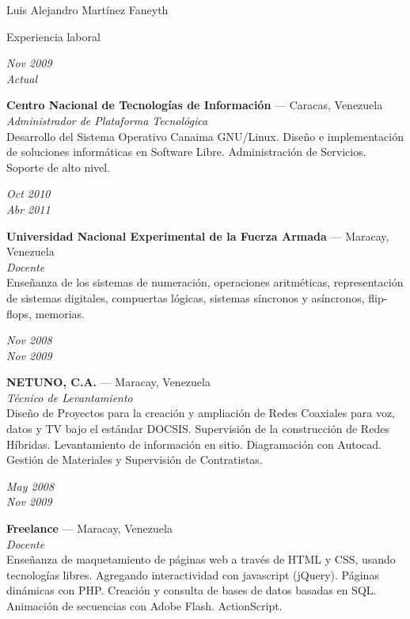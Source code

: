 \documentclass[letterpaper]{scrartcl}
\begin{document}
\begin{cv}{Luis Alejandro Mart\'inez Faneyth}
\begin{cvlist}{Experiencia laboral}
\item[{\parbox[t]{6em}{\textit{\large{Nov 2009\\Actual}}}}]{
	\parbox[t]{\linewidth}{
		\textbf{Centro Nacional de Tecnolog\'ias de Informaci\'on} --- Caracas, Venezuela\\
		\textit{Administrador de Plataforma Tecnol\'ogica}\\
		\footnotesize{Desarrollo del Sistema Operativo Canaima GNU/Linux. Dise\~no e implementaci\'on de soluciones inform\'aticas en Software Libre. Administraci\'on de Servicios. Soporte de alto nivel.}
	}
}
\item[{\parbox[t]{6em}{\textit{\large{Oct 2010\\Abr 2011}}}}]{
	\parbox[t]{\linewidth}{
		\textbf{Universidad Nacional Experimental de la Fuerza Armada} --- Maracay, Venezuela\\
		\textit{Docente}\\
		\footnotesize{Ense\~nanza de los sistemas de numeraci\'on, operaciones aritm\'eticas, representaci\'on de sistemas digitales, compuertas l\'ogicas, sistemas s\'incronos y as\'incronos, flip-flops, memorias.}
	}
}
\item[{\parbox[t]{6em}{\textit{\large{Nov 2008\\Nov 2009}}}}]{
	\parbox[t]{\linewidth}{
		\textbf{NETUNO, C.A.} --- Maracay, Venezuela\\
		\textit{T\'ecnico de Levantamiento}\\
		\footnotesize{Dise\~no de Proyectos para la creaci\'on y ampliaci\'on de Redes Coaxiales para voz, datos y TV bajo el est\'andar DOCSIS. Supervisi\'on de la construcci\'on de Redes H\'ibridas. Levantamiento de informaci\'on en sitio. Diagramaci\'on con Autocad. Gesti\'on de Materiales y Supervisi\'on de Contratistas.}
	}
}
\item[{\parbox[t]{6em}{\textit{\large{May 2008\\Nov 2009}}}}]{
	\parbox[t]{\linewidth}{
		\textbf{Freelance} --- Maracay, Venezuela\\
		\textit{Docente}\\
		\footnotesize{Ense\~nanza de maquetamiento de p\'aginas web a trav\'es de HTML y CSS, usando tecnolog\'ias libres. Agregando interactividad con javascript (jQuery). P\'aginas din\'amicas con PHP. Creaci\'on y consulta de bases de datos basadas en SQL. Animaci\'on de secuencias con Adobe Flash. ActionScript.}
	}
}
\end{cvlist}


\end{cv}
\end{document}
